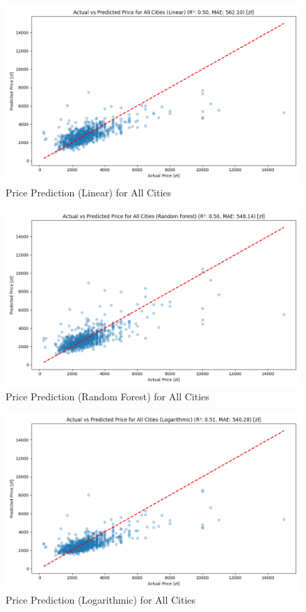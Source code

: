 \begin{figure}[H]
    \centering
    \includegraphics[width=0.8\linewidth]{figures/all_cities_price_prediction_linear.png}
    \caption{Price Prediction (Linear) for All Cities}
    \label{fig:all-cities-price-prediction-linear}
\end{figure}
\newpage

\begin{figure}[H]
    \centering
    \includegraphics[width=0.8\linewidth]{figures/all_cities_price_prediction_rf.png}
    \caption{Price Prediction (Random Forest) for All Cities}
    \label{fig:all-cities-price-prediction-rf}
\end{figure}

\begin{figure}[H]
    \centering
    \includegraphics[width=0.8\linewidth]{figures/all_cities_price_prediction_logarithmic.png}
    \caption{Price Prediction (Logarithmic) for All Cities}
    \label{fig:all-cities-price-prediction-logarithmic}
\end{figure}
\newpage